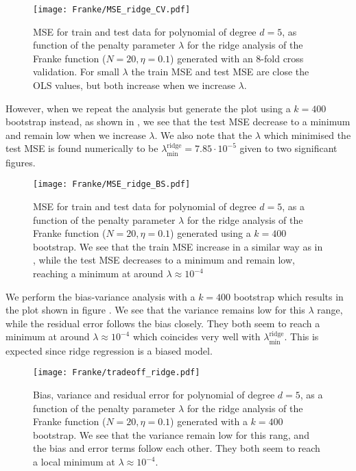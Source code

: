         \begin{figure}
            \texttt{[image: Franke/MSE\_ridge\_CV.pdf]}
            \caption{MSE for train and test data for polynomial of degree $d=5$, as function of the penalty parameter $\lambda$ for the ridge analysis of the Franke function ($N=20, \eta=0.1$) generated with an 8-fold cross validation. For small $\lambda$ the train MSE and test MSE are close the OLS values, but both increase when we increase $\lambda$.}
            \label{fig:cross-validation_ridge}
        \end{figure}

        However, when we repeat the analysis but generate the plot using a $k=400$ bootstrap instead, as shown in , we see that the test MSE decrease to a minimum and remain low when we increase $\lambda$. We also note that the $\lambda$ which minimised the test MSE is found numerically to be $\lambda_\mathrm{min}^\mathrm{ridge} = 7.85\cdot10^{-5}$ given to two significant figures. 


        \begin{figure}
            \texttt{[image: Franke/MSE\_ridge\_BS.pdf]}
            \caption{MSE for train and test data for polynomial of degree $d=5$, as a function of the penalty parameter $\lambda$ for the ridge analysis of the Franke function ($N=20, \eta=0.1$) generated using a $k=400$ bootstrap. We see that the train MSE increase in a similar way as in , while the test MSE decreases to a minimum and remain low, reaching a minimum at around $\lambda\approx 10^{-4}$ }
            \label{fig:bootstrapping_ridge}
        \end{figure}

        We perform the bias-variance analysis with a $k=400$ bootstrap which results in the plot shown in figure . We see that the variance remains low for this $\lambda$ range, while the residual error follows the bias closely. They both seem to reach a minimum at around $\lambda\approx 10^{-4}$ which coincides very well with $\lambda^\mathrm{ridge}_\mathrm{min}$. This is expected since ridge regression is a biased model. 

        \begin{figure}
            \texttt{[image: Franke/tradeoff\_ridge.pdf]}
            \caption{Bias, variance and residual error for polynomial of degree $d=5$, as a function of the penalty parameter $\lambda$ for the ridge analysis of the Franke function ($N=20, \eta=0.1$) generated with a $k=400$ bootstrap. We see that the variance remain low for this rang, and the bias and error terms follow each other. They both seem to reach a local minimum at $\lambda\approx 10^{-4}$.}
            \label{fig:bias_variance_ridge}
        \end{figure}

